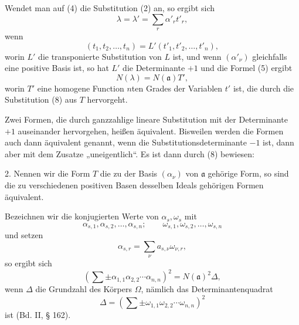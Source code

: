 \documentclass[11pt]{article}
\begin{document}
Wendet man auf (4) die Substitution (2) an, so ergibt sich
\begin{equation}
 \lambda=\lambda'=\sum_r \alpha'_r t'_r,\tag{7}
\end{equation}
wenn
\begin{equation}
 (t_1,t_2,\ldots,t_n)=L'(t'_1,t'_2,\ldots,t'_n),\tag{8}
\end{equation}
worin $L'$ die transponierte Substitution von $L$ ist, und wenn $(\alpha'_\nu)$ gleichfalls eine positive Basis ist, so hat $L'$ die Determinante $+1$ und die Formel (5) ergibt
\begin{equation}
 N(\lambda)=N(\mathfrak a)T',\tag{9}
\end{equation}
worin $T'$ eine homogene Function $n$ten Grades der Variablen $t'$ ist, die durch die Substitution (8) aus $T$ hervorgeht.

Zwei Formen, die durch ganzzahlige lineare Substitution mit der Determinante $+1$ auseinander hervorgehen, heißen äquivalent. Bisweilen werden die Formen auch dann äquivalent genannt, wenn die Substitutionsdeterminante $-1$ ist, dann aber mit dem Zusatze „uneigentlich“. Es ist dann durch (8) bewiesen:

2. Nennen wir die Form $T$ die zu der Basis $(\alpha_\nu)$ von $\mathfrak a$ gehörige Form, so sind die zu verschiedenen positiven Basen desselben Ideals gehörigen Formen äquivalent.

Bezeichnen wir die konjugierten Werte von $\alpha_s,\omega_s$ mit
\[
 \alpha_{s,1},\alpha_{s,2},\ldots,\alpha_{s,n};\qquad
 \omega_{s,1},\omega_{s,2},\ldots,\omega_{s,n}
\]
und setzen
\begin{equation}
 \alpha_{s,r}=\sum_\nu a_{s,\nu}\omega_{\nu,r},\tag{10}
\end{equation}
so ergibt sich
\begin{equation}
 \left(\sum\pm \alpha_{1,1}\alpha_{2,2}\cdots\alpha_{n,n}\right)^2=N(\mathfrak a)^2\Delta,\tag{11}
\end{equation}
wenn $\Delta$ die Grundzahl des Körpers $\Omega$, nämlich das Determinantenquadrat
\[
 \Delta=\left(\sum\pm \omega_{1,1}\omega_{2,2}\cdots\omega_{n,n}\right)^2
\]
ist (Bd. II, § 162).
\end{document}
